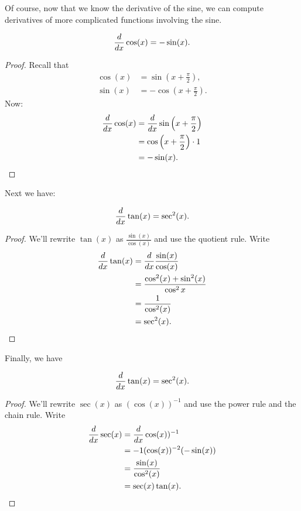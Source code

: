 Of course, now that we know the derivative of the sine, we can compute
derivatives of more complicated functions involving the sine.


\begin{theorem}
\[
\frac{d}{dx} \cos(x) = -\sin(x).
\]
\end{theorem}

\begin{proof}
Recall that
\begin{align*}
\cos(x) &= \sin\left(x+\frac{\pi}{2}\right), \\
\sin(x) &= -\cos\left(x+\frac{\pi}{2}\right).
\end{align*}
Now:
\begin{align*}
\frac{d}{dx} \cos(x) &= \frac{d}{dx} \sin\left(x+\frac{\pi}{2}\right)\\
&=\cos\left(x+\frac{\pi}{2}\right)\cdot 1 \\
&= -\sin(x).
\end{align*}
\end{proof}

Next we have:

\begin{theorem}
\[
\frac{d}{dx} \tan(x) = \sec^2(x).
\]
\end{theorem}

\begin{proof}
We'll rewrite $\tan(x)$ as $\frac{\sin(x)}{\cos(x)}$ and use the quotient rule. Write
\begin{align*}
\frac{d}{dx}\tan(x) &= \frac{d}{dx}\frac{\sin(x)}{\cos(x)}\\
&=\frac{\cos^2(x) + \sin^2(x)}{\cos^2 x}\\
&=\frac{1}{\cos^2(x)}\\
&=\sec^2(x).
\end{align*}
\end{proof}

Finally, we have

\begin{theorem}
\[
\frac{d}{dx} \tan(x) = \sec^2(x).
\]
\end{theorem}

\begin{proof}
We'll rewrite $\sec(x)$ as $(\cos(x))^{-1}$ and use the power rule and the chain rule. Write
\begin{align*}
\frac{d}{dx} \sec(x) &= \frac{d}{dx}\cos (x))^{-1}\\
&=-1(\cos(x))^{-2}(-\sin(x)) \\
&= \frac{\sin(x)}{\cos^2(x)} \\
&= \sec(x)\tan(x).
\end{align*}
\end{proof}


